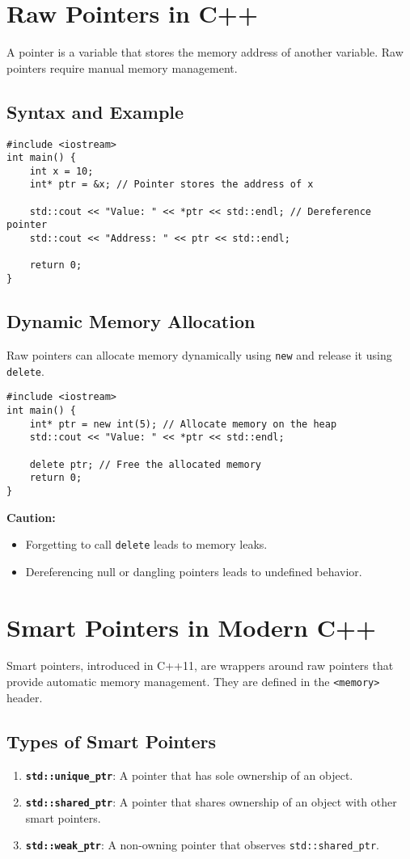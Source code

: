 \section{Raw Pointers in C++}
A pointer is a variable that stores the memory address of another variable. Raw pointers require manual memory management.

\subsection{Syntax and Example}
\begin{verbatim}
#include <iostream>
int main() {
    int x = 10;
    int* ptr = &x; // Pointer stores the address of x
    
    std::cout << "Value: " << *ptr << std::endl; // Dereference pointer
    std::cout << "Address: " << ptr << std::endl;
    
    return 0;
}
\end{verbatim}

\subsection{Dynamic Memory Allocation}
Raw pointers can allocate memory dynamically using \texttt{new} and release it using \texttt{delete}.
\begin{verbatim}
#include <iostream>
int main() {
    int* ptr = new int(5); // Allocate memory on the heap
    std::cout << "Value: " << *ptr << std::endl;
    
    delete ptr; // Free the allocated memory
    return 0;
}
\end{verbatim}

\textbf{Caution:}
\begin{itemize}
    \item Forgetting to call \texttt{delete} leads to memory leaks.
    \item Dereferencing null or dangling pointers leads to undefined behavior.
\end{itemize}

\section{Smart Pointers in Modern C++}
Smart pointers, introduced in C++11, are wrappers around raw pointers that provide automatic memory management. They are defined in the \texttt{<memory>} header.

\subsection{Types of Smart Pointers}
\begin{enumerate}
    \item \textbf{\texttt{std::unique\_ptr}}: A pointer that has sole ownership of an object.
    \item \textbf{\texttt{std::shared\_ptr}}: A pointer that shares ownership of an object with other smart pointers.
    \item \textbf{\texttt{std::weak\_ptr}}: A non-owning pointer that observes \texttt{std::shared\_ptr}.
\end{enumerate}


